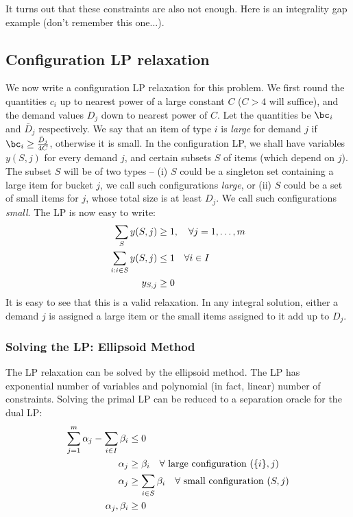 It turns out that these constraints are also not enough. Here is an integrality gap example (don't remember this one...).

\newcommand{\barD}{{\bar D}}

\subsection{Configuration LP relaxation}
We now write a configuration LP relaxation for this problem. We first round the quantities $c_i$ up to nearest power of a large constant $C$ ($C > 4$
will suffice), and the demand values $D_j$ down to nearest power of $C$. Let the quantities be $\bc_i$ and $\barD_j$ respectively. 
 We say that an item of type $i$ is {\em large} for demand $j$ if $\bc_i \geq \frac{\barD_j}{4C}$, otherwise it is small.
In the configuration LP, we shall have variables $y(S,j)$ for every demand $j$, and certain subsets $S$ of items (which depend on $j$). 
The subset $S$ will be of two types -- (i) $S$ could be a singleton set containing a large item for bucket $j$, we call such configurations {\em large}, or (ii) $S$ could be a set of small items for $j$, whose total size is at least $D_j$.
We call such configurations {\em small}. The LP is now easy to write:
\begin{align}
\label{eq:config1}
\sum_{S} y(S,j) & \geq 1, \ \ \ \forall j=1, \ldots, m \\
\label{eq:config2}
\sum_{i: i \in S} y(S,j) & \leq 1 \ \ \ \forall i  \in I \\
\notag
y_{S,j} & \geq 0
\end{align}
It is easy to see that this is a valid relaxation. In any integral solution, either a demand $j$ is assigned a large item or the small items assigned to it add 
up to $D_j$. 
\subsubsection{Solving the LP: Ellipsoid Method}
The LP relaxation can be solved by the ellipsoid method. The LP has exponential number of variables and polynomial (in fact, linear) number of 
constraints. Solving the primal LP  can be reduced to 
a separation oracle for the dual LP: 
\begin{align}
\label{eq:config3}
 \sum_{j=1}^m \alpha_j - \sum_{i \in I} \beta_i & \leq 0 \\
\label{eq:config4}
\alpha_j & \geq  \beta_i \ \ \ \forall \ {\mbox{large configuration $(\{i\}, j)$}} \\
\label{eq:config5}
\alpha_j & \geq  \sum_{i \in S} \beta_i \ \ \ \forall \ {\mbox{small configuration $(S, j)$}} \\
\notag
\alpha_j, \beta_i & \geq 0
\end{align}

